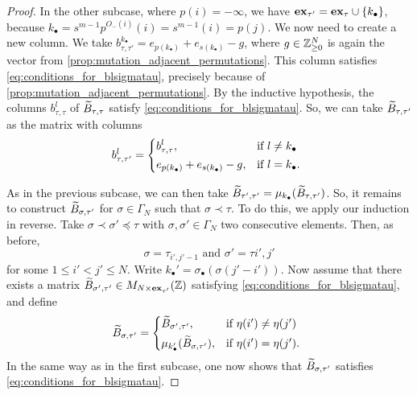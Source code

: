 \begin{proof}
	In the other subcase, where $p(i) = -\infty$, we have $\mathbf{ex}_{\tau'} = \mathbf{ex}_\tau \cup
		\{k_\bullet\}$, because $k_\bullet = s^{m-1}p^{O_{-}(i)}(i) = s^{m-1}(i) = p(j)$. We
	now need to create a new column. We take $b^{k_\bullet}_{\tau, \tau'} =
		e_{p(k_\bullet)} + e_{s(k_\bullet)} - g$, where $g \in \mathbb{Z}_{\geq 0}^N$ is again the
	vector from \cref{prop:mutation_adjacent_permutations}. This column satisfies
	\cref{eq:conditions_for_blsigmatau}, precisely because of
	\cref{prop:mutation_adjacent_permutations}. By the inductive hypothesis, the columns
	$b^l_{\tau, \tau}$ of $\widetilde{B}_{\tau, \tau}$ satisfy \cref{eq:conditions_for_blsigmatau}.
	So, we can take $\widetilde{B}_{\tau, \tau'}$ as the matrix with columns
	\begin{equation*}
		b^l_{\tau, \tau'} = \begin{dcases*}
			b^l_{\tau, \tau},                        & if $l \neq k_\bullet$ \\
			e_{p(k_\bullet)} + e_{s(k_\bullet)} - g, & if $l = k_\bullet$.
		\end{dcases*}
	\end{equation*}

	As in the previous subcase, we can then take $\widetilde{B}_{\tau', \tau'} =
		\mu_{k_\bullet}(\widetilde{B}_{\tau, \tau'})$. So, it remains to construct $\widetilde{B}_{\sigma, \tau'}$
	for $\sigma \in \Gamma_N$ such that $\sigma \prec \tau$. To do this, we apply our
	induction in reverse. Take $\sigma \prec \sigma' \preceq \tau$ with $\sigma, \sigma'
		\in \Gamma_N$ two consecutive elements. Then, as before,
	\begin{equation*}
		\sigma = \tau_{i',j' -1} \text{ and } \sigma' = \tau{i', j'}
	\end{equation*}
	for some $1 \leq i'< j' \leq N$. Write $k_\bullet' = \sigma_\bullet(\sigma(j' - i'))$. Now assume that there exists a matrix $\widetilde{B}_{\sigma', \tau'} \in M_{N \times \mathbf{ex}_{\tau'}}(\mathbb{Z})$ satisfying \cref{eq:conditions_for_blsigmatau}, and define
	\begin{equation*}
		\tB_{\sigma, \tau'} = \begin{dcases*}
			\tB_{\sigma', \tau'},                  & if $\eta(i') \neq \eta(j')$ \\
			\mu_{k_\bullet'}(\tB_{\sigma, \tau'}), & if $\eta(i') = \eta(j')$.
		\end{dcases*}
	\end{equation*}
	In the same way as in the first subcase, one now shows that $\widetilde{B}_{\sigma, \tau'}$
	satisfies \cref{eq:conditions_for_blsigmatau}.

\end{proof}

